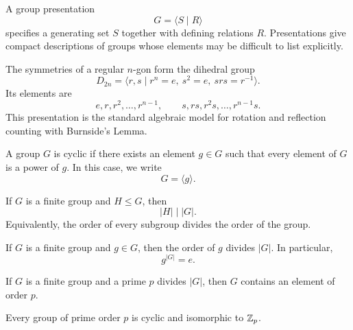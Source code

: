     \begin{definition}
        A group presentation
        \[
            G=\langle S\mid R\rangle
        \]
        specifies a generating set $S$ together with defining relations $R$.
        Presentations give compact descriptions of groups whose elements may be
        difficult to list explicitly.
    \end{definition}

    \begin{fact}
        The symmetries of a regular $n$-gon form the dihedral group
        \[
            D_{2n}
            =
            \langle r,s\mid r^n=e,\ s^2=e,\ srs=r^{-1}\rangle.
        \]
        Its elements are
        \[
            e,r,r^2,\dots,r^{n-1},
            \qquad
            s,rs,r^2s,\dots,r^{n-1}s.
        \]
        This presentation is the standard algebraic model for rotation and
        reflection counting with Burnside's Lemma.
    \end{fact}

    \begin{definition}
        A group $G$ is cyclic if there exists an element $g\in G$ such that every
        element of $G$ is a power of $g$. In this case, we write
        \[
            G=\langle g\rangle.
        \]
    \end{definition}

    \begin{theorem}
        If $G$ is a finite group and $H\leq G$, then
        \[
            |H|\mid |G|.
        \]
        Equivalently, the order of every subgroup divides the order of the group.
    \end{theorem}

    \begin{corollary}
        If $G$ is a finite group and $g\in G$, then the order of $g$ divides
        $|G|$. In particular,
        \[
            g^{|G|}=e.
        \]
    \end{corollary}

    \begin{theorem}
        If $G$ is a finite group and a prime $p$ divides $|G|$, then $G$ contains
        an element of order $p$.
    \end{theorem}

    \begin{corollary}
        Every group of prime order $p$ is cyclic and isomorphic to $\mathbb{Z}_p$.
    \end{corollary}

